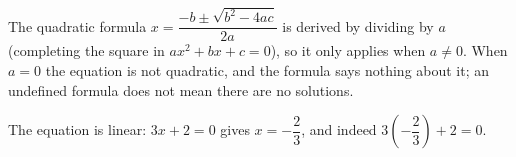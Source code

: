 The quadratic formula $x=\dfrac{-b\pm\sqrt{b^2-4ac}}{2a}$ is derived by dividing by $a$ (completing the square in $ax^2+bx+c=0$), so it only applies when $a\ne0$. When $a=0$ the equation is not quadratic, and the formula says nothing about it; an undefined formula does not mean there are no solutions.

The equation is linear: $3x+2=0$ gives $\boxed{x=-\dfrac{2}{3}}$, and indeed $3\left(-\dfrac{2}{3}\right)+2=0$.
